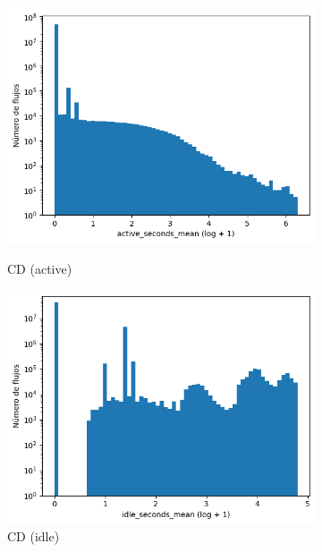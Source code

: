 \begin{figure}[H]
    \centering
    \begin{subfigure}[b]{0.26\textwidth}
        \centering
        \includegraphics[width=\textwidth]{media/packet_pincer_cicddos/active_seconds_mean_log_x_log_y.png}
        \caption{CD (active)}
        \includegraphics[width=\textwidth]{media/packet_pincer_cicddos/idle_seconds_mean_log_x_log_y.png}
        \caption{CD (idle)}
    \end{subfigure}
    \hfill
    \begin{subfigure}[b]{0.26\textwidth}
        \centering

\end{subfigure}
\end{figure}
